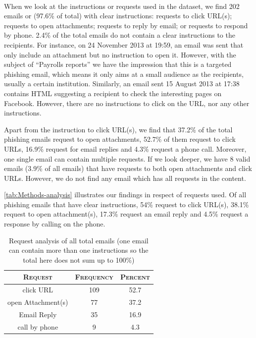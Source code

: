 \ 

When we look at the instructions or requests used in the dataset,
we find 202 emails or (97.6\% of total) with clear instructions: requests
to click URL(s); requests to open attachments; requests to reply by
email; or requests to respond by phone. 2.4\% of the total emails
do not contain a clear instructions to the recipients. For instance,
on 24 November 2013 at 19:59, an email was sent that only include
an attachment but no instruction to open it. However, with the subject
of \textquotedblleft Payrolls reports\textquotedblright{} we have
the impression that this is a targeted phishing email, which means
it only aims at a small audience as the recipients, usually a certain
institution. Similarly, an email sent 15 August 2013 at 17:38 contains
HTML suggesting a recipient to check the interesting pages on Facebook.
However, there are no instructions to click on the URL, nor any other
instructions. 

Apart from the instruction to click URL(s), we find that 37.2\% of
the total phishing emails request to open attachments, 52.7\% of them
request to click URLs, 16.9\% request for email replies and 4.3\%
request a phone call. Moreover, one single email can contain multiple
requests. If we look deeper, we have 8 valid emails (3.9\% of all
emails) that have requests to both open attachments and click URLs.
However, we do not find any email which has all requests in the content.

\autoref{tab:Methods-analysis} illustrates our findings in respect
of requests used. Of all phishing emails that have clear instructions,
54\% request to click URL(s), 38.1\% request to open attachment(s),
17.3\% request an email reply and 4.5\% request a response by calling
on the phone.

\begin{table}[H]
\begin{centering}
\begin{tabular}{ccc}
\toprule 
\textsc{\small{}Request} & \textsc{\small{}Frequency} & \textsc{\small{}Percent}\tabularnewline
\midrule
\midrule 
{\small{}click URL} & {\small{}109} & {\small{}52.7}\tabularnewline
\midrule 
{\small{}open Attachment(s)} & {\small{}77} & {\small{}37.2}\tabularnewline
\midrule 
{\small{}Email Reply} & {\small{}35} & 16.9\tabularnewline
\midrule 
{\small{}call by phone} & {\small{}9} & {\small{}4.3}\tabularnewline
\bottomrule
\end{tabular}\protect\caption{\label{tab:Methods-analysis}Request analysis of all total emails
(one email can contain more than one instructions so the total here
does not sum up to 100\%)}

\par\end{centering}

%
%
\end{table}


